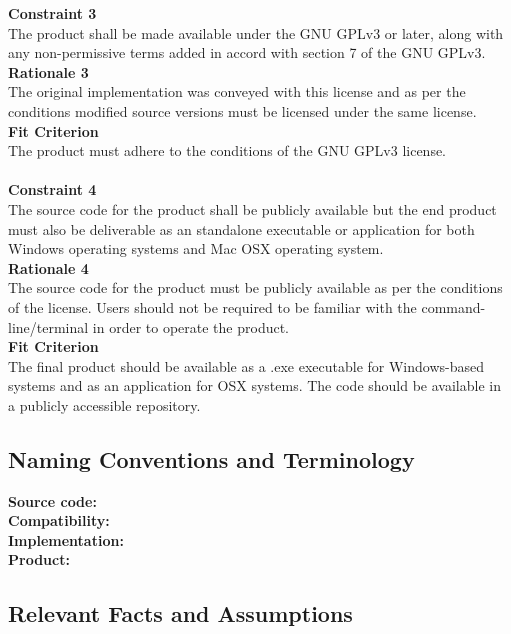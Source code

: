 \documentclass{article}
\begin{document}
		\noindent \textbf {Constraint 3}\\
		\indent The product shall be made available under the GNU GPLv3 or 
		later, along with any non-permissive terms added in accord with section 
		7 of the GNU GPLv3.\\
		\textbf {Rationale 3}\\
		\indent The original implementation was conveyed with this license and 
		as per 
		the conditions modified source versions must be licensed under the same 
		license.\\
		\textbf {Fit Criterion}\\
		\indent The product must adhere to the conditions of the GNU GPLv3 
		license.\\\\
		
		\noindent \textbf {Constraint 4}\\
		\indent The source code for the product shall be publicly available but 
		the end product must also be deliverable as an standalone executable or 
		application for both Windows operating systems and Mac OSX operating 
		system.\\
		\textbf {Rationale 4}\\
		\indent The source code for the product must be publicly available as 
		per the conditions of the license. Users should not be required to be 
		familiar with the command-line/terminal in order to operate the 
		product.\\
		\textbf {Fit Criterion}\\
		\indent The final product should be available as a .exe executable for 
		Windows-based systems and as an application for OSX systems. The code 
		should be available in a publicly accessible repository.\\
		
		\subsection{Naming Conventions and Terminology}
		\textbf {Source code:}\\
		\textbf {Compatibility:}\\
		\textbf {Implementation:}\\
		\textbf {Product:}\\
		
		\subsection{Relevant Facts and Assumptions}
		
\end{document}

